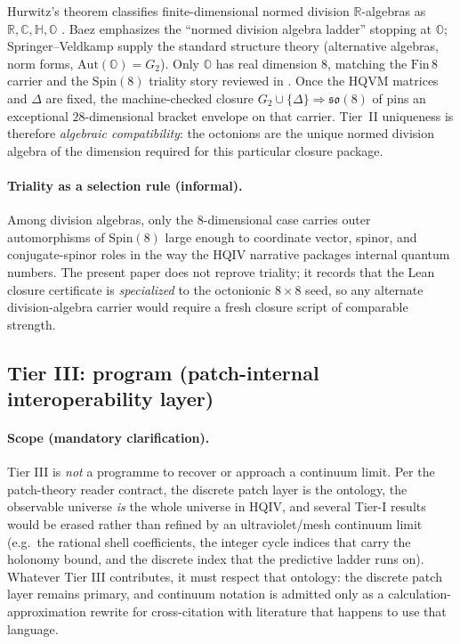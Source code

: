 \documentclass[11pt]{amsart}
\begin{document}
Hurwitz's theorem classifies finite-dimensional normed division \(\mathbb{R}\)-algebras as \(\mathbb{R},\mathbb{C},\mathbb{H},\mathbb{O}\) \cite{baez2002,springer2000}. Baez emphasizes the ``normed division algebra ladder'' stopping at \(\mathbb{O}\); Springer--Veldkamp supply the standard structure theory (alternative algebras, norm forms, \(\mathrm{Aut}(\mathbb{O})=G_2\)). Only \(\mathbb{O}\) has real dimension \(8\), matching the \(\mathrm{Fin}\,8\) carrier and the \(\mathrm{Spin}(8)\) triality story reviewed in \cite{hqiv-3d-growth-paper}. Once the HQVM matrices and \(\Delta\) are fixed, the machine-checked closure \(G_2\cup\{\Delta\}\Rightarrow\mathfrak{so}(8)\) of \cite{hqiv-so8-paper} pins an exceptional \(28\)-dimensional bracket envelope on that carrier. Tier~II uniqueness is therefore \emph{algebraic compatibility}: the octonions are the unique normed division algebra of the dimension required for this particular closure package.

\paragraph{Triality as a selection rule (informal).}
Among division algebras, only the \(8\)-dimensional case carries outer automorphisms of \(\mathrm{Spin}(8)\) large enough to coordinate vector, spinor, and conjugate-spinor roles in the way the HQIV narrative packages internal quantum numbers. The present paper does not reprove triality; it records that the Lean closure certificate is \emph{specialized} to the octonionic \(8\times 8\) seed, so any alternate division-algebra carrier would require a fresh closure script of comparable strength.

\subsection{Tier III: program (patch-internal interoperability layer)}
\label{subsec:tierIII}

\paragraph{Scope (mandatory clarification).}
Tier III is \emph{not} a programme to recover or approach a continuum limit. Per the patch-theory reader contract, the discrete patch layer is the ontology, the observable universe \emph{is} the whole universe in HQIV, and several Tier-I results would be erased rather than refined by an ultraviolet/mesh continuum limit (e.g.\ the rational shell coefficients, the integer cycle indices that carry the holonomy bound, and the discrete index that the predictive ladder runs on). Whatever Tier III contributes, it must respect that ontology: the discrete patch layer remains primary, and continuum notation is admitted only as a calculation-approximation rewrite for cross-citation with literature that happens to use that language.
\end{document}
